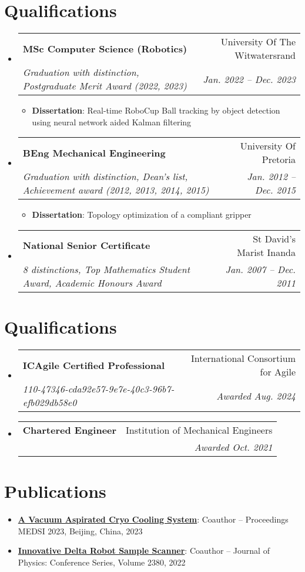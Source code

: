 \documentclass[letterpaper,11pt]{article}
\makeatletter
\newcommand{\resumeItem}[2]{
  \item\small{
    \textbf{#1}{: #2 \vspace{-2pt}}
  }
}
\newcommand{\resumeSubheading}[4]{
  \vspace{-1pt}\item
    \begin{tabular*}{0.97\textwidth}[t]{l@{\extracolsep{\fill}}r}
      \textbf{#1} & #2 \\
      \textit{\small#3} & \textit{\small #4} \\
    \end{tabular*}\vspace{-5pt}
}
\newcommand{\resumeSubItem}[2]{\resumeItem{#1}{#2}\vspace{-4pt}}
\newcommand{\resumeSubHeadingListStart}{\begin{itemize}[leftmargin=*]}
\newcommand{\resumeSubHeadingListEnd}{\end{itemize}}
\makeatother
\begin{document}
\section{Qualifications}
  \resumeSubHeadingListStart
    \resumeSubheading
      {MSc Computer Science (Robotics)} {University Of The Witwatersrand}
      {Graduation with distinction, Postgraduate Merit Award (2022, 2023)}{Jan. 2022 -- Dec. 2023}
        \resumeSubHeadingListStart
			\resumeSubItem{Dissertation}
      		{Real-time RoboCup Ball tracking by object detection using neural network aided Kalman filtering}
		\resumeSubHeadingListEnd
    \resumeSubheading
      {BEng Mechanical Engineering}{University Of Pretoria}
      {Graduation with distinction, Dean's list, Achievement award (2012, 2013, 2014, 2015)}{Jan. 2012 -- Dec. 2015}
    	\resumeSubHeadingListStart
			\resumeSubItem{Dissertation}
      		{Topology optimization of a compliant gripper}
		\resumeSubHeadingListEnd
     \resumeSubheading
      {National Senior Certificate}{St David’s Marist Inanda}
      {8 distinctions, Top Mathematics Student Award, Academic Honours Award}{Jan. 2007 -- Dec. 2011}
  \resumeSubHeadingListEnd

\section{Qualifications}
  \resumeSubHeadingListStart
      \resumeSubheading
      {ICAgile Certified Professional} {International Consortium for Agile}
      {110-47346-cda92e57-9e7e-40c3-96b7-efb029db58e0}{Awarded Aug. 2024}
    \resumeSubheading
      {Chartered Engineer} {Institution of Mechanical Engineers}
      {}{Awarded Oct. 2021}
  \resumeSubHeadingListEnd

\section{Publications}
  \resumeSubHeadingListStart
    \resumeSubItem{\href{https://accelconf.web.cern.ch/medsi2023/papers/weoam02.pdf}{A Vacuum Aspirated Cryo Cooling System}}
      {Coauthor -- Proceedings MEDSI 2023, Beijing, China, 2023}
    \resumeSubItem{\href{https://iopscience.iop.org/article/10.1088/1742-6596/2380/1/012113/pdf}{Innovative Delta Robot Sample Scanner}}
      {Coauthor -- Journal of Physics: Conference Series, Volume 2380, 2022}
  \resumeSubHeadingListEnd

%


\end{document}
